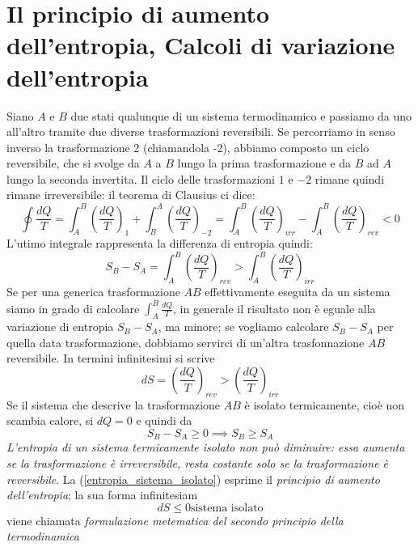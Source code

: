 \documentclass[class=book, crop=false, oneside, 12pt]{standalone}
\begin{document}
\section{Il principio di aumento dell'entropia, Calcoli di variazione dell'entropia}
Siano \(A\) e \(B\) due stati qualunque di un sistema termodinamico e passiamo da uno all'altro tramite due diverse trasformazioni reversibili.
Se percorriamo in senso inverso la trasformazione 2 (chiamandola -2), abbiamo composto un ciclo reversibile, che si svolge da \(A\) a \(B\) lungo la prima trasformazione e da \(B\) ad \( A\) lungo la seconda invertita.\newline
Il ciclo delle trasformazioni \(1\) e \(-2\) rimane quindi rimane irreversibile: il teorema di Clausius ci dice:
\begin{equation*}
    \oint \frac{d Q}{T} = \int_A^B \left(\frac{d Q}{T}\right)_1 + \int_B^A \left(\frac{d Q}{T}\right)_{-2} = \int_A^B \left(\frac{d Q}{T}\right)_{irr} - \int_A^B \left(\frac{d Q}{T}\right)_{rev} < 0
\end{equation*}
L'utimo integrale rappresenta la differenza di entropia quindi:
\begin{equation}
    S_B - S_A = \int_A^B \left(\frac{d Q}{T}\right)_{rev} > \int_A^B \left(\frac{d Q}{T}\right)_{irr}
\end{equation}
Se per una generica trasformazione \(A B\) effettivamente eseguita da un sistema siamo in grado di calcolare \(\int_A^B \frac{d Q}{T}\), in generale il risultato non è eguale alla variazione di entropia \(S_B - S_A\), ma minore; se vogliamo calcolare \(S_B - S_A\) per quella data trasformazione, dobbiamo servirci di un'altra trasfonnazione \(A B\) reversibile.
In termini infinitesimi si scrive
\begin{equation}
    d S = \left(\frac{d Q}{T}\right)_{rev} > \left(\frac{d Q}{T}\right)_{irr}
\end{equation}
Se il sistema che descrive la trasformazione \(A B\) è isolato termicamente, cioè non scambia calore, si \(d Q = 0\) e quindi da
\begin{equation} \label{entropia_sistema_isolato}
    S_B - S_A \geq 0 \implies S_B \geq S_A
\end{equation}
\emph{L'entropia di un sistema termicamente isolato non può diminuire: essa aumenta se la trasformazione è irreversibile, resta costante solo se la trasformazione è reversibile}.
La (\ref{entropia_sistema_isolato}) esprime il \emph{principio di aumento dell'entropia}; la sua forma infinitesiam
\begin{equation}
    d S \leq 0 \text{sistema isolato}
\end{equation}
viene chiamata \emph{formulazione metematica del secondo principio della termodinamica}
\end{document}
